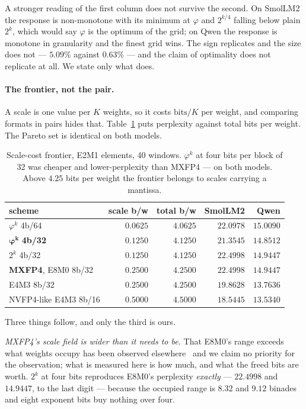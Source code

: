 A stronger reading of the first column does not survive the second. On SmolLM2
the response is non-monotone with its minimum at $\varphi$ and $2^{k/4}$ falling
below plain $2^{k}$, which would say $\varphi$ is the optimum of the grid; on
Qwen the response is monotone in granularity and the finest grid wins. The sign
replicates and the size does not --- $5.09\%$ against $0.63\%$ --- and the claim
of optimality does not replicate at all. We state only what does.

\paragraph{The frontier, not the pair.} A scale is one value per $K$ weights,
so it costs $\mathrm{bits}/K$ per weight, and comparing formats in pairs hides
that. Table~\ref{tab:frontier} puts perplexity against total bits per weight.
The Pareto set is identical on both models.

\begin{table}[t]\centering
\caption{Scale-cost frontier, E2M1 elements, 40 windows. $\varphi^{k}$ at four
bits per block of 32 was cheaper and lower-perplexity than MXFP4 --- on both
models. Above $4.25$ bits per weight the frontier belongs to scales carrying a
mantissa.}
\label{tab:frontier}
\begin{tabular}{lrrrr}
\toprule
scheme & scale b/w & total b/w & SmolLM2 & Qwen \\
\midrule
$\varphi^{k}$ 4b/64        & $0.0625$ & $4.0625$ & $22.0978$ & $15.0090$ \\
$\boldsymbol{\varphi^{k}}$ \textbf{4b/32} & $\mathbf{0.1250}$ & $\mathbf{4.1250}$ & $\mathbf{21.3545}$ & $\mathbf{14.8512}$ \\
$2^{k}$ 4b/32              & $0.1250$ & $4.1250$ & $22.4998$ & $14.9447$ \\
\textbf{MXFP4}, E8M0 8b/32 & $0.2500$ & $4.2500$ & $22.4998$ & $14.9447$ \\
E4M3 8b/32                 & $0.2500$ & $4.2500$ & $19.8628$ & $13.7636$ \\
NVFP4-like E4M3 8b/16      & $0.5000$ & $4.5000$ & $18.5445$ & $13.5340$ \\
\bottomrule
\end{tabular}
\end{table}

Three things follow, and only the third is ours.

\emph{MXFP4's scale field is wider than it needs to be.} That E8M0's range
exceeds what weights occupy has been observed elsewhere~\cite{mxgap} and we
claim no priority for the observation; what is measured here is how much, and
what the freed bits are worth. $2^{k}$ at four bits reproduces E8M0's perplexity
\emph{exactly} --- $22.4998$ and
$14.9447$, to the last digit --- because the occupied range is $8.32$ and
$9.12$ binades and eight exponent bits buy nothing over four.

